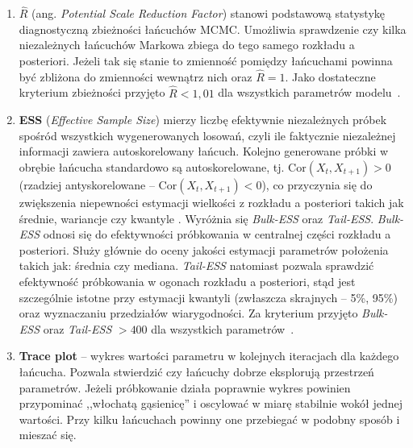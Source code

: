 \documentclass[12pt, a4paper]{article}
\begin{document}
\begin{enumerate}
    \item \textbf{$\hat{R}$} (ang. \textit{Potential Scale Reduction Factor}) stanowi podstawową statystykę diagnostyczną zbieżności łańcuchów MCMC. Umożliwia sprawdzenie czy kilka niezależnych łańcuchów Markowa zbiega do tego samego rozkładu a posteriori. Jeżeli tak się stanie to zmienność pomiędzy łańcuchami powinna być zbliżona do zmienności wewnątrz nich oraz $\hat{R} = 1$. Jako dostateczne kryterium zbieżności przyjęto $\hat{R} < 1{,}01$ dla wszystkich parametrów modelu~\cite{vehtari2019rhat}.
    \item \textbf{ESS} (\textit{Effective Sample Size}) mierzy liczbę efektywnie niezależnych próbek spośród wszystkich wygenerowanych losowań, czyli ile faktycznie niezależnej informacji zawiera autoskorelowany łańcuch. Kolejno generowane próbki w obrębie łańcucha standardowo są autoskorelowane, tj. $\mathrm{Cor}(X_t, X_{t+1}) > 0$ (rzadziej antyskorelowane -- $\mathrm{Cor}(X_t, X_{t+1}) < 0$), co przyczynia się do zwiększenia niepewności estymacji wielkości z rozkładu a posteriori takich jak średnie, wariancje czy kwantyle \cite{stan_ess_current}. Wyróżnia się \textit{Bulk-ESS} oraz \textit{Tail-ESS}. \textit{Bulk-ESS} odnosi się do efektywności próbkowania w centralnej części rozkładu a posteriori. Służy głównie do oceny jakości estymacji parametrów położenia takich jak: średnia czy mediana. \textit{Tail-ESS} natomiast pozwala sprawdzić efektywność próbkowania w ogonach rozkładu a posteriori, stąd jest szczególnie istotne przy estymacji kwantyli (zwłaszcza skrajnych -- 5\%, 95\%) oraz wyznaczaniu przedziałów wiarygodności. Za kryterium przyjęto \textit{Bulk-ESS} oraz \textit{Tail-ESS} $> 400$ dla wszystkich parametrów~\cite{vehtari2019rhat}. 

    \item \textbf{Trace plot} -- wykres wartości parametru w kolejnych iteracjach dla każdego łańcucha. Pozwala stwierdzić czy łańcuchy dobrze eksplorują przestrzeń parametrów. Jeżeli próbkowanie działa poprawnie wykres powinien przypominać ,,włochatą gąsienicę'' i oscylować w miarę stabilnie wokół jednej wartości. Przy kilku łańcuchach powinny one przebiegać w podobny sposób i mieszać się.
\end{enumerate}
\end{document}
